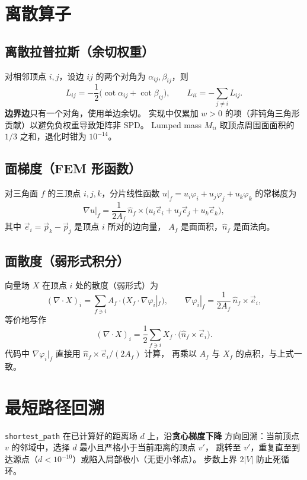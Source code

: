 \documentclass[11pt,a4paper]{article}
\begin{document}
\section{离散算子}

\subsection{离散拉普拉斯（余切权重）}

对相邻顶点 $i, j$，设边 $ij$ 的两个对角为 $\alpha_{ij}, \beta_{ij}$，则
\[
  L_{ij} = -\frac{1}{2}\bigl(\cot \alpha_{ij} + \cot \beta_{ij}\bigr),
  \qquad
  L_{ii} = -\sum_{j \ne i} L_{ij}.
\]
\textbf{边界边}只有一个对角，使用单边余切。
实现中仅累加 $w > 0$ 的项（非钝角三角形贡献）以避免负权重导致矩阵非 SPD。
Lumped mass $M_{ii}$ 取顶点周围面面积的 $1/3$ 之和，退化时钳为 $10^{-14}$。

\subsection{面梯度（FEM 形函数）}

对三角面 $f$ 的三顶点 $i, j, k$，分片线性函数
$u|_f = u_i \varphi_i + u_j \varphi_j + u_k \varphi_k$ 的常梯度为
\[
  \nabla u|_f = \frac{1}{2 A_f}\, \hat{n}_f \times
  \bigl( u_i \vec{e}_i + u_j \vec{e}_j + u_k \vec{e}_k \bigr),
\]
其中 $\vec{e}_i = \vec{p}_k - \vec{p}_j$ 是顶点 $i$ 所对的边向量，
$A_f$ 是面面积，$\hat{n}_f$ 是面法向。

\subsection{面散度（弱形式积分）}

向量场 $X$ 在顶点 $i$ 处的散度（弱形式）为
\[
  (\nabla \cdot X)_i = \sum_{f \ni i} A_f \cdot \bigl( X_f \cdot \nabla \varphi_i|_f \bigr),
  \qquad
  \nabla \varphi_i|_f = \frac{1}{2 A_f}\, \hat{n}_f \times \vec{e}_i,
\]
等价地写作
\[
  (\nabla \cdot X)_i = \frac{1}{2} \sum_{f \ni i} X_f \cdot \bigl( \hat{n}_f \times \vec{e}_i \bigr).
\]
代码中 $\nabla \varphi_i|_f$ 直接用 $\hat{n}_f \times \vec{e}_i / (2 A_f)$ 计算，
再乘以 $A_f$ 与 $X_f$ 的点积，与上式一致。

\section{最短路径回溯}

\texttt{shortest\_path} 在已计算好的距离场 $d$ 上，沿\textbf{贪心梯度下降}
方向回溯：当前顶点 $v$ 的邻域中，选择 $d$ 最小且严格小于当前距离的顶点 $v'$，
跳转至 $v'$，重复直至到达源点（$d < 10^{-10}$）或陷入局部极小（无更小邻点）。
步数上界 $2|V|$ 防止死循环。
\end{document}
